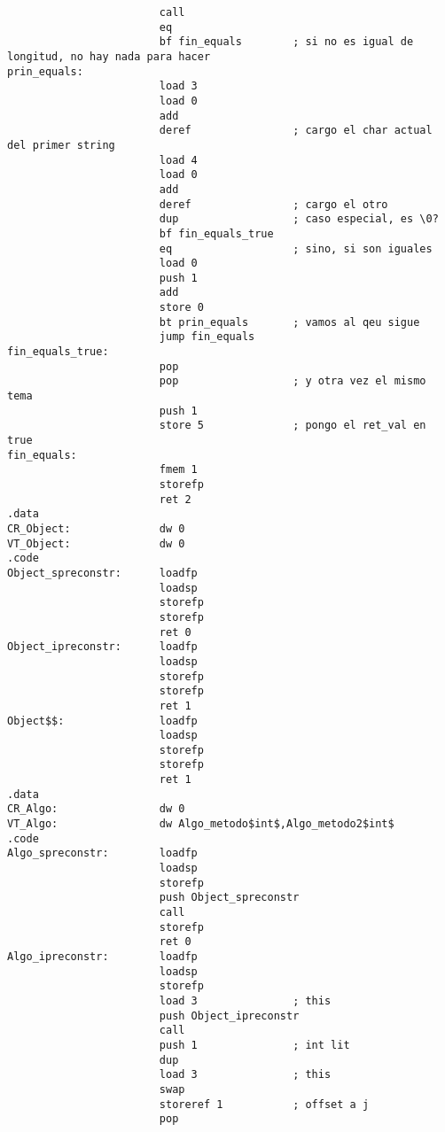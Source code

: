 \documentclass [a4paper,abstracton,titlepage]{scrartcl}
\begin{document}
\begin{lstlisting}
                        call
                        eq
                        bf fin_equals        ; si no es igual de longitud, no hay nada para hacer
prin_equals:           
                        load 3
                        load 0
                        add
                        deref                ; cargo el char actual del primer string
                        load 4
                        load 0
                        add
                        deref                ; cargo el otro
                        dup                  ; caso especial, es \0?
                        bf fin_equals_true
                        eq                   ; sino, si son iguales
                        load 0
                        push 1
                        add
                        store 0
                        bt prin_equals       ; vamos al qeu sigue
                        jump fin_equals
fin_equals_true:       
                        pop
                        pop                  ; y otra vez el mismo tema
                        push 1
                        store 5              ; pongo el ret_val en true
fin_equals:            
                        fmem 1
                        storefp
                        ret 2
.data
CR_Object:              dw 0
VT_Object:              dw 0
.code
Object_spreconstr:      loadfp
                        loadsp
                        storefp
                        storefp
                        ret 0
Object_ipreconstr:      loadfp
                        loadsp
                        storefp
                        storefp
                        ret 1
Object$$:               loadfp
                        loadsp
                        storefp
                        storefp
                        ret 1
.data
CR_Algo:                dw 0
VT_Algo:                dw Algo_metodo$int$,Algo_metodo2$int$
.code
Algo_spreconstr:        loadfp
                        loadsp
                        storefp
                        push Object_spreconstr
                        call
                        storefp
                        ret 0
Algo_ipreconstr:        loadfp
                        loadsp
                        storefp
                        load 3               ; this
                        push Object_ipreconstr
                        call
                        push 1               ; int lit
                        dup
                        load 3               ; this
                        swap
                        storeref 1           ; offset a j
                        pop

\end{lstlisting}
\end{document}

